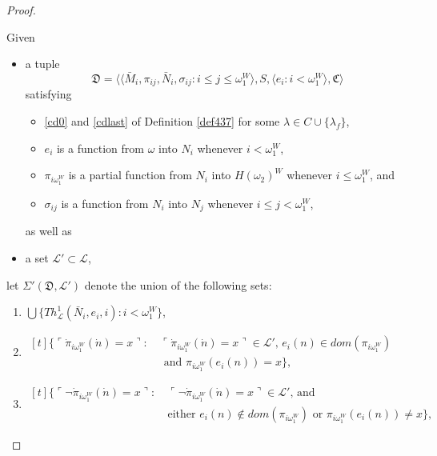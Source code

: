 \documentclass[12pt]{article}
\numberwithin{equation}{section}
\begin{document}
\begin{proof}
\begin{defi}\label{def439}
Given 
\begin{itemize}
    \item a tuple
    \begin{equation*}
        \mathfrak{D} = \langle \langle \bar{M}_i, \pi_{ij},  \bar{N}_i, \sigma_{ij} : i \leq j \leq \omega_1^{W} \rangle, S, \langle e_i : i < \omega_1^W \rangle, \mathfrak{C} \rangle
    \end{equation*}
    satisfying 
    \begin{itemize}[label=$\circ$]
        \item \ref{cd0} and \ref{cdlast} of Definition \ref{def437} for some $\lambda \in C \cup \{\lambda_f\}$, 
        \item $e_i$ is a function from $\omega$ into $N_i$ whenever $i < \omega_1^W$, 
        \item $\pi_{i\omega_1^W}$ is a partial function from $N_i$ into $H(\omega_2)^W$ whenever $i \leq \omega_1^W$, and
        \item $\sigma_{ij}$ is a function from $N_i$ into $N_j$ whenever $i \leq j < \omega_1^W$,
    \end{itemize}
    as well as 
    \item a set $\mathcal{L}' \subset \mathcal{L}$,
\end{itemize}
let $\Sigma'(\mathfrak{D}, \mathcal{L}')$ denote the union of the following sets:
\begin{enumerate}[label=(\alph*)]
    \item $\bigcup \{Th^{1}_{\mathcal{L}}(\bar{N}_i, e_i, i) : i < \omega_1^W\}$,
    \item 
    \!
    $\begin{aligned}[t]
        \{\ulcorner \dot{\pi}_{i\omega_1^W}(\dot{n}) = x \urcorner : \ & \ulcorner \dot{\pi}_{i\omega_1^W}(\dot{n}) = x \urcorner \in \mathcal{L}' \text{, } e_i(n) \in dom(\pi_{i\omega_1^W}) \\ 
        & \text{ and } \pi_{i\omega_1^W}(e_i(n)) = x\} \text{,}
    \end{aligned}$
    \item 
    \!
    $\begin{aligned}[t]
        \{\ulcorner \neg \dot{\pi}_{i\omega_1^W}(\dot{n}) = x \urcorner : \ & \ulcorner \neg \dot{\pi}_{i\omega_1^W}(\dot{n}) = x \urcorner \in \mathcal{L}' \text{, and} \\
        & \text{either } e_i(n) \not\in dom(\pi_{i\omega_1^W}) \text{ or } \pi_{i\omega_1^W}(e_i(n)) \neq x\} \text{,}
    \end{aligned}$

\end{enumerate}
\end{defi}
\end{proof}
\end{document}
